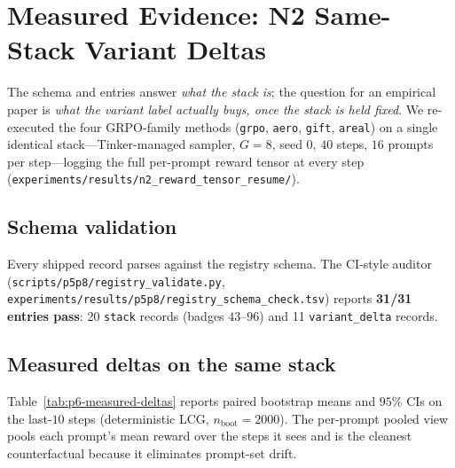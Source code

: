 \section{Measured Evidence: N2 Same-Stack Variant Deltas}
\label{sec:p6-measured}

The schema and entries answer \emph{what the stack is}; the question for an
empirical paper is \emph{what the variant label actually buys, once the
stack is held fixed}. We re-executed the four GRPO-family methods
(\texttt{grpo}, \texttt{aero}, \texttt{gift}, \texttt{areal}) on a single
identical stack---Tinker-managed sampler, $G{=}8$, seed $0$, $40$ steps,
$16$ prompts per step---logging the full per-prompt reward tensor at every
step (\texttt{experiments/results/n2\_reward\_tensor\_resume/}).

\subsection{Schema validation}
Every shipped record parses against the registry schema. The CI-style
auditor (\texttt{scripts/p5p8/registry\_validate.py},
\texttt{experiments/results/p5p8/registry\_schema\_check.tsv}) reports
\textbf{31/31 entries pass}: 20 \texttt{stack} records (badges $43$--$96$)
and 11 \texttt{variant\_delta} records.

\subsection{Measured deltas on the same stack}
Table~\ref{tab:p6-measured-deltas} reports paired bootstrap means and
$95\%$ CIs on the last-$10$ steps (deterministic LCG, $n_{\text{boot}}=2000$).
The per-prompt pooled view pools each prompt's mean reward over the steps
it sees and is the cleanest counterfactual because it eliminates
prompt-set drift.

